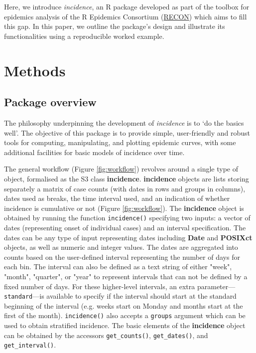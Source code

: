 \documentclass[9pt,a4paper]{extarticle}
\begin{document}
Here, we introduce \emph{incidence}, an R package developed as part of the toolbox for epidemics analysis of the R Epidemics Consortium (\href{http://www.repidemicsconsortium.org/}{RECON}) which aims to fill this gap.
In this paper, we outline the package's design and illustrate its functionalities using a reproducible worked example.


\section*{Methods}

\subsection*{Package overview}

The philosophy underpinning the development of \emph{incidence} is to `do the basics well'.
The objective of this package is to provide simple, user-friendly and robust tools for computing, manipulating, and plotting epidemic curves, with some additional facilities for basic models of incidence over time.

The general workflow (Figure \ref{fig:workflow}) revolves around a single type of object, formalised as the S3 class \textbf{incidence}.
\textbf{incidence} objects are lists storing separately a matrix of case counts (with dates in rows and groups in columns), dates used as breaks, the time interval used, and an indication of whether incidence is cumulative or not (Figure \ref{fig:workflow}).
The \textbf{incidence} object is obtained by running the function \texttt{incidence()} specifying two inputs: a vector of dates (representing onset of individual cases) and an interval specification. 
The dates can be any type of input representing dates including \textbf{Date} and \textbf{POSIXct} objects, as well as numeric and integer values.
The dates are aggregated into counts based on the user-defined interval representing the number of days for each bin.
The interval can also be defined as a text string of either "week", "month", "quarter", or "year" to represent intervals that can not be defined by a fixed number of days.
For these higher-level intervals, an extra parameter---\texttt{standard}---is available to specify if the interval should start at the standard beginning of the interval (e.g. weeks start on Monday and months start at the first of the month).
\texttt{incidence()} also accepts a \texttt{groups} argument which can be used to obtain stratified incidence.
The basic elements of the \textbf{incidence} object can be obtained by the accessors \texttt{get\_counts()}, \texttt{get\_dates()}, and \texttt{get\_interval()}.
\end{document}
